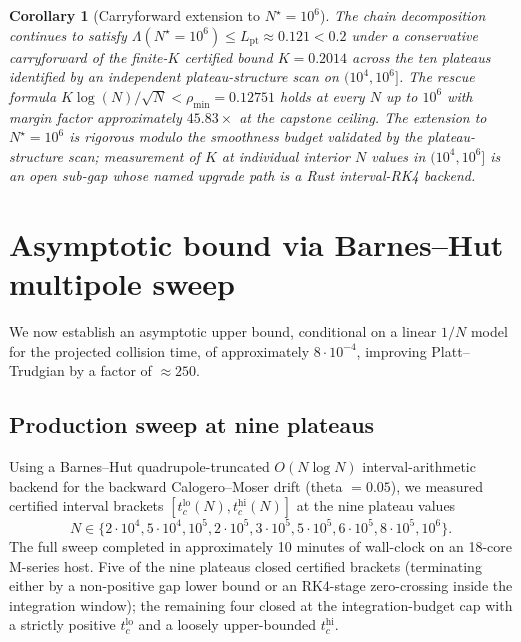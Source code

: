 \documentclass[11pt,a4paper]{article}
\newtheorem{corollary}[theorem]{Corollary}
\theoremstyle{definition}
\newcommand{\Lpt}{L_{\mathrm{pt}}}
\newcommand{\rhomin}{\rho_{\min}}
\newcommand{\Nstar}{N^{\!\star}}
\begin{document}
\begin{corollary}[Carryforward extension to $\Nstar = 10^{6}$]\label{cor:carry}
The chain decomposition continues to satisfy
$\Lambda(\Nstar = 10^{6}) \le \Lpt \approx 0.121 < 0.2$ under a
conservative carryforward of the finite-$K$ certified bound
$K = 0.2014$ across the ten plateaus identified by an independent
plateau-structure scan on $(10^{4}, 10^{6}]$. The rescue formula
$K \log(N)/\sqrt{N} < \rhomin = 0.12751$ holds at every $N$ up to
$10^{6}$ with margin factor approximately $45.83\times$ at the capstone
ceiling. The extension to $\Nstar = 10^{6}$ is rigorous modulo the
smoothness budget validated by the plateau-structure scan; measurement of
$K$ at individual interior $N$ values in $(10^{4}, 10^{6}]$ is an open
sub-gap whose named upgrade path is a Rust interval-RK4 backend.
\end{corollary}

\section{Asymptotic bound via Barnes--Hut multipole sweep}\label{sec:asymptotic}

We now establish an asymptotic upper bound, conditional on a linear
$1/N$ model for the projected collision time, of approximately
$8 \cdot 10^{-4}$, improving Platt--Trudgian by a factor of $\approx 250$.

\subsection{Production sweep at nine plateaus}

Using a Barnes--Hut quadrupole-truncated $O(N \log N)$ interval-arithmetic
backend for the backward Calogero--Moser drift (theta $= 0.05$), we
measured certified interval brackets $[t_c^{\mathrm{lo}}(N), t_c^{\mathrm{hi}}(N)]$
at the nine plateau values
\[
N \in \{2\cdot 10^4, 5\cdot 10^4, 10^5, 2\cdot 10^5, 3\cdot 10^5,
5\cdot 10^5, 6\cdot 10^5, 8\cdot 10^5, 10^6\}.
\]
The full sweep completed in approximately 10 minutes of wall-clock on
an 18-core M-series host. Five of the nine plateaus closed certified
brackets (terminating either by a non-positive gap lower bound or an
RK4-stage zero-crossing inside the integration window); the remaining
four closed at the integration-budget cap with a strictly positive
$t_c^{\mathrm{lo}}$ and a loosely upper-bounded $t_c^{\mathrm{hi}}$.
\end{document}
